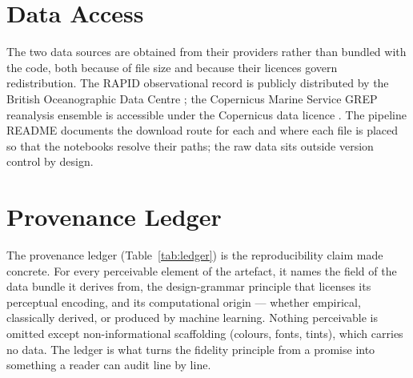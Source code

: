 \section{Data Access}
\label{app:c-data}

The two data sources are obtained from their providers rather than bundled with the code, both
because of file size and because their licences govern redistribution. The RAPID observational
record is publicly distributed by the British Oceanographic Data Centre \citep{moat2026}; the
Copernicus Marine Service GREP reanalysis ensemble is accessible under the Copernicus data
licence \citep{copernicus_grep}. The pipeline README documents the download route for each and
where each file is placed so that the notebooks resolve their paths; the raw data sits outside
version control by design.

\section{Provenance Ledger}
\label{app:c-ledger}

The provenance ledger (Table~\ref{tab:ledger}) is the reproducibility claim made concrete. For
every perceivable element of the artefact, it names the field of the data bundle it derives
from, the design-grammar principle that licenses its perceptual encoding, and its computational
origin --- whether empirical, classically derived, or produced by machine learning. Nothing
perceivable is omitted except non-informational scaffolding (colours, fonts, tints), which
carries no data. The ledger is what turns the fidelity principle from a promise into something
a reader can audit line by line.

